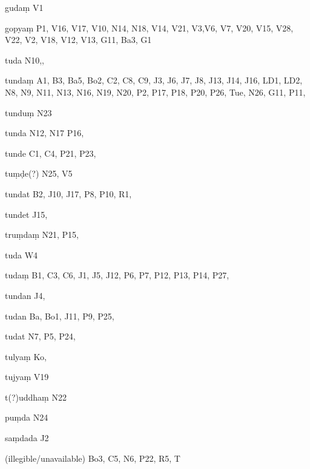 \begin{marma}[hp02_009]
\begin{marma}[hp02_011]
\begin{marma}[hp02_33b]
\begin{description}
    \end{description}
 \end{marma}

 \begin{marma}[hp02_34b]
\item[gudaṃ] V1
\item[gopyaṃ] P1, V16, V17, V10, N14, N18, V14, V21, V3,V6, V7, V20, V15, V28, V22, V2, V18, V12, V13, G11, Ba3, G1
\item[tuda] N10,,
\item[tundaṃ] A1, B3, Ba5, Bo2, C2, C8, C9, J3, J6, J7, J8, J13, J14, J16, LD1, LD2, N8, N9, N11, N13, N16, N19, N20, P2, P17, P18, P20, P26, Tue, N26, G11, P11, 
\item[tunduṃ] N23
\item[tunda] N12, N17 P16, 
\item[tunde] C1, C4, P21, P23,  
\item[tuṃḍe(?)] N25, V5
\item[tundat] B2, J10, J17, P8, P10, R1, 
\item[tundet] J15, 
\item[truṃdaṃ] N21, P15, 
\item[tuda] W4
\item[tudaṃ] B1, C3, C6, J1, J5, J12, P6, P7, P12, P13, P14, P27, 	
\item[tundan] J4,
\item[tudan] Ba, Bo1, J11, P9, P25,  
\item[tudat] N7, P5, P24, 
\item[tulyaṃ] Ko,
\item[tujyaṃ] V19
\item[t(?)uddhaṃ] N22
\item[puṃda] N24
\item[saṃdada] J2
\item[(illegible/unavailable)] Bo3, C5, N6, P22, R5, T
  \begin{description}

    \end{description}
 \end{marma}


\end{marma}
\end{marma}
